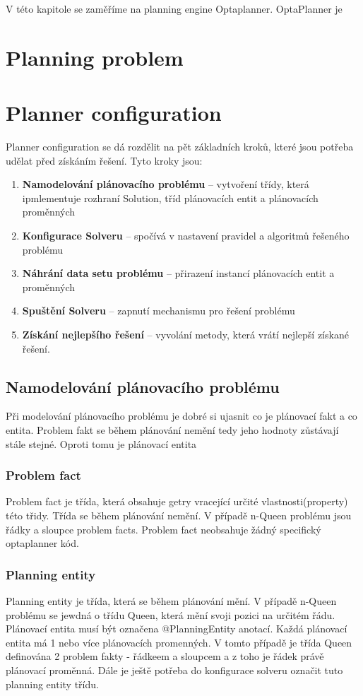 V této kapitole se zaměříme na planning engine Optaplanner. OptaPlanner je 

\section{Planning problem}

\section{Planner configuration}
Planner configuration se dá rozdělit na pět základních kroků, které jsou potřeba udělat před získáním řešení. Tyto kroky jsou:
\begin{enumerate}
\item \textbf{Namodelování plánovacího problému} -- vytvoření třídy, která ipmlementuje rozhraní Solution, tříd plánovacích entit a plánovacích proměnných
\item \textbf{Konfigurace Solveru} -- spočívá v nastavení pravidel a algoritmů řešeného problému
\item \textbf{Náhrání data setu problému} -- přirazení instancí plánovacích entit a proměnných
\item \textbf{Spuštění Solveru} -- zapnutí mechanismu pro řešení problému
\item \textbf{Získání nejlepšího řešení} -- vyvolání metody, která vrátí nejlepší získané řešení.
\end{enumerate}

\subsection{Namodelování plánovacího problému}
Při modelování plánovacího problému je dobré si ujasnit co je plánovací fakt a co entita. Problem fakt se během plánování nemění tedy jeho hodnoty zůstávají stále stejné. Oproti tomu je plánovací entita 
 
\subsubsection{Problem fact}
Problem fact je třída, která obsahuje getry vracející určité vlastnosti(property) této třidy. Třída se během plánování nemění. V případě n-Queen problému jsou řádky a sloupce problem facts. Problem fact neobsahuje žádný specifický optaplanner kód.

\subsubsection{Planning entity}
Planning entity je třída, která se během plánování mění. V případě n-Queen problému se jewdná o třídu Queen, která mění svoji pozici na určitém řádu. Plánovací entita musí být označena @PlanningEntity anotací. Každá plánovací entita má 1 nebo více plánovacích promenných.  V tomto případě je třída Queen definována 2 problem fakty - řádkeem a sloupcem a z toho je řádek právě plánovací proměnná. Dále je ještě potřeba do konfigurace solveru označit tuto planning entity třídu.


